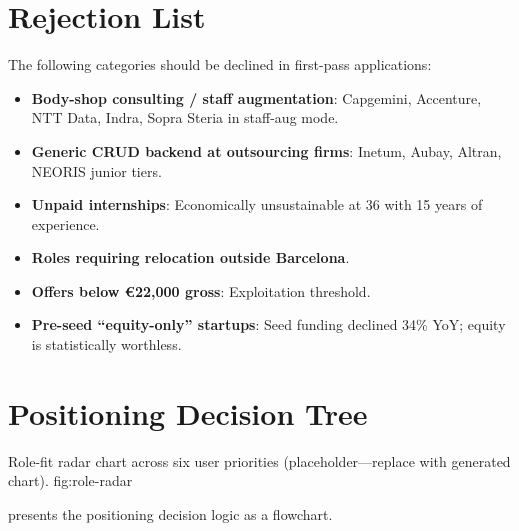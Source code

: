 \documentclass[a4paper,11pt,openany]{report}
\begin{document}
\section{Rejection List}

The following categories should be declined in first-pass applications:

\begin{itemize}
  \item \textbf{Body-shop consulting / staff augmentation}: Capgemini,
    Accenture, NTT Data, Indra, Sopra Steria in staff-aug mode.
  \item \textbf{Generic CRUD backend at outsourcing firms}: Inetum, Aubay,
    Altran, NEORIS junior tiers.
  \item \textbf{Unpaid internships}: Economically unsustainable at 36 with
    15 years of experience.
  \item \textbf{Roles requiring relocation outside Barcelona}.
  \item \textbf{Offers below €22,000 gross}: Exploitation threshold.
  \item \textbf{Pre-seed ``equity-only'' startups}: Seed funding declined
    34\% YoY; equity is statistically worthless.
\end{itemize}

\section{Positioning Decision Tree}

%
  {Role-fit radar chart across six user priorities (placeholder---replace with generated chart).}%
  {fig:role-radar}

 presents the positioning decision logic as a flowchart.
\end{document}
